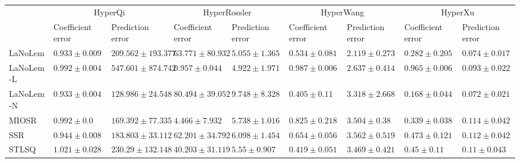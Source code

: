 \begin{table*}
{\begin{tabular}{lllllllll}
 & \multicolumn{2}{c}{HyperQi} & \multicolumn{2}{c}{HyperRossler} & \multicolumn{2}{c}{HyperWang} & \multicolumn{2}{c}{HyperXu} \\
 & Coefficient error & Prediction error & Coefficient error & Prediction error & Coefficient error & Prediction error & Coefficient error & Prediction error \\
\midrule
LaNoLem & $\mathbf{0.933}\pm 0.009$ & $209.562\pm 193.377$ & $63.771\pm 80.932$ & $5.055\pm 1.365$ & $0.534\pm 0.081$ & $\mathbf{2.119}\pm 0.273$ & $0.282\pm 0.205$ & $0.074\pm 0.017$ \\
LaNoLem-L & $0.992\pm 0.004$ & $547.601\pm 874.742$ & $\mathbf{0.957}\pm 0.044$ & $\mathbf{4.922}\pm 1.971$ & $0.987\pm 0.006$ & $2.637\pm 0.414$ & $0.965\pm 0.006$ & $0.093\pm 0.022$ \\
LaNoLem-N & $0.933\pm 0.004$ & $\mathbf{128.986}\pm 24.548$ & $80.494\pm 39.052$ & $9.748\pm 8.328$ & $\mathbf{0.405}\pm 0.11$ & $3.318\pm 2.668$ & $\mathbf{0.168}\pm 0.044$ & $\mathbf{0.072}\pm 0.021$ \\
MIOSR & $0.992\pm 0.0$ & $169.392\pm 77.335$ & $4.466\pm 7.932$ & $5.738\pm 1.016$ & $0.825\pm 0.218$ & $3.504\pm 0.38$ & $0.339\pm 0.038$ & $0.114\pm 0.042$ \\
SSR & $0.944\pm 0.008$ & $183.803\pm 33.112$ & $62.201\pm 34.792$ & $6.098\pm 1.454$ & $0.654\pm 0.056$ & $3.562\pm 0.519$ & $0.473\pm 0.121$ & $0.112\pm 0.042$ \\
STLSQ & $1.021\pm 0.028$ & $230.29\pm 132.148$ & $40.203\pm 31.119$ & $5.55\pm 0.907$ & $0.419\pm 0.051$ & $3.469\pm 0.421$ & $0.45\pm 0.11$ & $0.11\pm 0.043$ \\

\midrule


\end{tabular}}
\end{table*}
